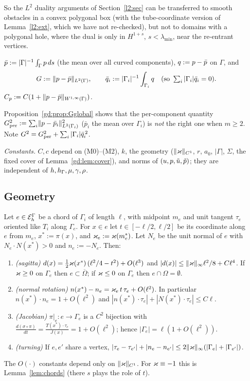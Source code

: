 So the $L^2$ duality arguments of Section~\ref{l2:sec} can be transferred to smooth obstacles in a convex polygonal box (with the tube-coordinate version of Lemma~\ref{l2:ext}, which we have not re-checked), but not to domains with a polygonal hole, where the dual is only in $H^{1+s}$, $s<\lambda_{\min}$, near the re-entrant vertices.

\begin{definition}\label{gd:def:G}
$\bar p:=|\Gamma|^{-1}\int_\Gamma p\,ds$ (the mean over all curved components), $q:=p-\bar p$ on $\Gamma$, and
\[
G:=\lVert p-\bar p\rVert_{L^2(\Gamma)},\qquad \bar q_i:=|\Gamma_i|^{-1}\int_{\Gamma_i}q\quad(\text{so }\textstyle\sum_i|\Gamma_i|\bar q_i=0).
\]
$C_p:=C(1+\lVert p-\bar p\rVert_{W^{1,\infty}(\Gamma)})$.
\end{definition}
Proposition~\ref{gd:prop:Gglobal} shows that the per-component quantity $G_{\rm per}^2:=\sum_i\lVert p-\bar p_i\rVert_{L^2(\Gamma_i)}^2$ ($\bar p_i$ the mean over $\Gamma_i$) is \emph{not} the right one when $m\ge2$. Note $G^2=G_{\rm per}^2+\sum_i|\Gamma_i|\bar q_i^{\,2}$.

\emph{Constants.} $C,c$ depend on (M0)--(M2), $k$, the geometry ($\lVert \varkappa\rVert_{C^1}$, $r$, $a_0$, $|\Gamma|$, $\Sigma$, the fixed cover of Lemma~\ref{gd:lem:cover}), and norms of $(u,p,\tilde u,\tilde p)$; they are independent of $h,h_\Gamma,\mu,\gamma,\rho$.

\subsection{Geometry}\label{gd:sec:geometry}

\begin{lemma}\label{gd:lem:chords}
Let $e\in\mathcal E_h^\Gamma$ be a chord of $\Gamma_i$ of length $\ell$, with midpoint $m_e$ and unit tangent $\tau_e$ oriented like $T_i$ along $\Gamma_e$. For $x\in e$ let $t\in[-\ell/2,\ell/2]$ be its coordinate along $e$ from $m_e$, $x^\ast:=\pi(x)$, and $\varkappa_e:=\varkappa(m_e^\ast)$. Let $N_e$ be the unit normal of $e$ with $N_e\cdot N(x^\ast)>0$ and $n_e:=-N_e$. Then:
\begin{enumerate}[label=(\alph*)]
\item \emph{(sagitta)} $d(x)=\tfrac12\varkappa(x^\ast)\,(\ell^2/4-t^2)+O(\ell^3)$ and $|d(x)|\le\lVert \varkappa\rVert_\infty\ell^2/8+C\ell^4$. If $\varkappa\ge0$ on $\Gamma_e$ then $e\subset\overline\Omega$; if $\varkappa\le0$ on $\Gamma_e$ then $e\cap\Omega=\emptyset$.
\item \emph{(normal rotation)} $n(x^\ast)-n_e=\varkappa_e\,t\,\tau_e+O(\ell^2)$. In particular $n(x^\ast)\cdot n_e=1+O(\ell^2)$ and $|n(x^\ast)\cdot\tau_e|+|N(x^\ast)\cdot\tau_e|\le C\ell$.
\item \emph{(Jacobian)} $\pi|_e:e\to\Gamma_e$ is a $C^2$ bijection with $\frac{d(\sigma\circ\pi)}{dt}=\frac{T(x^\ast)\cdot\tau_e}{J(x)}=1+O(\ell^2)$; hence $|\Gamma_e|=\ell(1+O(\ell^2))$.
\item \emph{(turning)} If $e,e'$ share a vertex, $|\tau_e-\tau_{e'}|+|n_e-n_{e'}|\le2\lVert \varkappa\rVert_\infty(|\Gamma_e|+|\Gamma_{e'}|)$.
\end{enumerate}
The $O(\cdot)$ constants depend only on $\lVert \varkappa\rVert_{C^1}$. For $\varkappa\equiv-1$ this is Lemma~\ref{lem:chords} (there $s$ plays the role of $t$).
\end{lemma}

